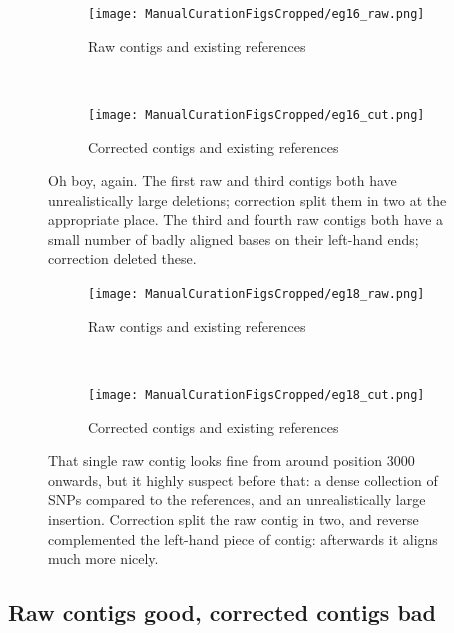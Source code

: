 \documentclass{article}
\begin{document}
\begin{landscape}
\begin{figure}[!h]
\centering
\begin{subfigure}{1.3\textwidth}
\texttt{[image: ManualCurationFigsCropped/eg16\_raw.png]}
\caption{Raw contigs and existing references}
\end{subfigure}
\vspace*{1cm} \\
\begin{subfigure}{1.3\textwidth}
\texttt{[image: ManualCurationFigsCropped/eg16\_cut.png]}
\caption{Corrected contigs and existing references}
\end{subfigure}
\caption{Oh boy, again.
The first raw and third contigs both have unrealistically large deletions; correction split them in two at the appropriate place.
The third and fourth raw contigs both have a small number of badly aligned bases on their left-hand ends; correction deleted these.
}
\end{figure}

\begin{figure}[!h]
\centering
\begin{subfigure}{1.3\textwidth}
\texttt{[image: ManualCurationFigsCropped/eg18\_raw.png]}
\caption{Raw contigs and existing references}
\end{subfigure}
\vspace*{1cm} \\
\begin{subfigure}{1.3\textwidth}
\texttt{[image: ManualCurationFigsCropped/eg18\_cut.png]}
\caption{Corrected contigs and existing references}
\end{subfigure}
\caption{That single raw contig looks fine from around position 3000 onwards, but it highly suspect before that: a dense collection of SNPs compared to the references, and an unrealistically large insertion.
Correction split the raw contig in two, and reverse complemented the left-hand piece of contig: afterwards it aligns much more nicely.}
\end{figure}


\clearpage
\subsection{Raw contigs good, corrected contigs bad}


\end{landscape}
\end{document}
